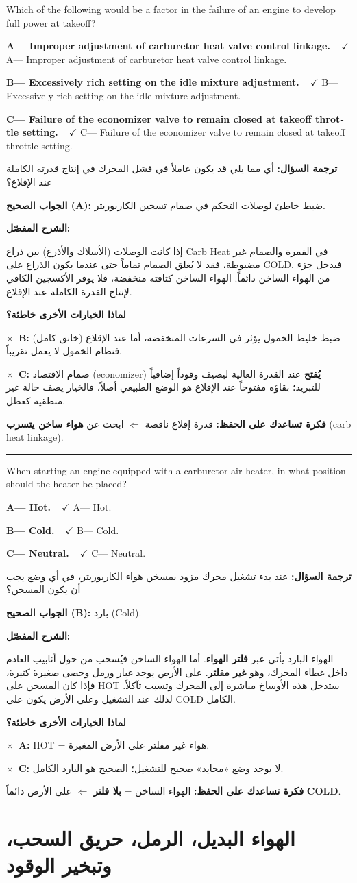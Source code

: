 \documentclass[11pt,a4paper]{article}
\newcommand{\en}[1]{\textenglish{#1}}
\newcommand{\correctletter}{}
\newcommand{\opt}[2]{%
  \ifdefstring{\correctletter}{#1}%
    {\textcolor{ansgreen}{\textbf{#1— #2\ \ $\checkmark$}}}%
    {#1— #2}\par}
\newcommand{\Q}[6]{%
  \renewcommand{\correctletter}{#6}%
  \par\bigskip
  \phantomsection\label{q#1}%
  \begin{tcolorbox}[enhanced,breakable,colback=qback,colframe=qframe,
      arc=2mm,boxrule=0.8pt,fonttitle=\bfseries,
      title={\en{Question #1}}]
    \begin{english}
      #2\par\smallskip
      \opt{A}{#3}\opt{B}{#4}\opt{C}{#5}
    \end{english}
  \end{tcolorbox}}
\newcommand{\tr}[1]{\textbf{\textcolor{qframe}{ترجمة السؤال:}} #1\par}
\newcommand{\ans}[2]{%
  \begin{tcolorbox}[colback=ansback,colframe=ansgreen,boxrule=0.6pt,arc=1.5mm,
      left=4pt,right=4pt,top=2pt,bottom=2pt]
    \textbf{\textcolor{ansgreen}{الجواب الصحيح (\en{#1}):}} #2
  \end{tcolorbox}}
\newcommand{\sharh}[1]{\textbf{\textcolor{conceptc}{الشرح المفصّل:}}\par #1\par}
\newcommand{\nohead}{\textbf{\textcolor{wrongc}{لماذا الخيارات الأخرى خاطئة؟}}\par}
\newcommand{\no}[2]{\hspace*{1em}\textcolor{wrongc}{$\times$}\ \textbf{\en{#1}:} #2\par}
\newcommand{\tip}[1]{%
  \begin{tcolorbox}[colback=tipback,colframe=tipframe,boxrule=0.5pt,arc=1.5mm,
      left=4pt,right=4pt,top=2pt,bottom=2pt]
    \textbf{فكرة تساعدك على الحفظ:} #1
  \end{tcolorbox}}
\newcommand{\qsep}{\par\medskip\noindent\textcolor{qframe!40}{\rule{\linewidth}{0.4pt}}\par}
\begin{document}
\Q{8785}{Which of the following would be a factor in the failure of an engine to develop full power at takeoff?}
{Improper adjustment of carburetor heat valve control linkage.}
{Excessively rich setting on the idle mixture adjustment.}
{Failure of the economizer valve to remain closed at takeoff throttle setting.}{A}
\tr{أي مما يلي قد يكون عاملاً في فشل المحرك في إنتاج قدرته الكاملة عند الإقلاع؟}
\ans{A}{ضبط خاطئ لوصلات التحكم في صمام تسخين الكاربوريتر.}
\sharh{إذا كانت الوصلات (الأسلاك والأذرع) بين ذراع \en{Carb Heat} في القمرة والصمام غير مضبوطة، فقد لا يُغلق الصمام تماماً حتى عندما يكون الذراع على \en{COLD}. فيدخل جزء من الهواء الساخن دائماً. الهواء الساخن كثافته منخفضة، فلا يوفر الأكسجين الكافي لإنتاج القدرة الكاملة عند الإقلاع.}
\nohead
\no{B}{ضبط خليط الخمول يؤثر في السرعات المنخفضة، أما عند الإقلاع (خانق كامل) فنظام الخمول لا يعمل تقريباً.}
\no{C}{صمام الاقتصاد (\en{economizer}) \textbf{يُفتح} عند القدرة العالية ليضيف وقوداً إضافياً للتبريد؛ بقاؤه مفتوحاً عند الإقلاع هو الوضع الطبيعي أصلاً، فالخيار يصف حالة غير منطقية كعطل.}
\tip{قدرة إقلاع ناقصة $\Leftarrow$ ابحث عن \textbf{هواء ساخن يتسرب} (\en{carb heat linkage}).}
\qsep

\Q{8804}{When starting an engine equipped with a carburetor air heater, in what position should the heater be placed?}
{Hot.}
{Cold.}
{Neutral.}{B}
\tr{عند بدء تشغيل محرك مزود بمسخن هواء الكاربوريتر، في أي وضع يجب أن يكون المسخن؟}
\ans{B}{بارد (\en{Cold}).}
\sharh{الهواء البارد يأتي عبر \textbf{فلتر الهواء}. أما الهواء الساخن فيُسحب من حول أنابيب العادم داخل غطاء المحرك، وهو \textbf{غير مفلتر}. على الأرض يوجد غبار ورمل وحصى صغيرة كثيرة، فإذا كان المسخن على \en{HOT} ستدخل هذه الأوساخ مباشرة إلى المحرك وتسبب تآكلاً. لذلك عند التشغيل وعلى الأرض يكون على \en{COLD} الكامل.}
\nohead
\no{A}{\en{HOT} = هواء غير مفلتر على الأرض المغبرة.}
\no{C}{لا يوجد وضع «محايد» صحيح للتشغيل؛ الصحيح هو البارد الكامل.}
\tip{الهواء الساخن = \textbf{بلا فلتر} $\Leftarrow$ على الأرض دائماً \en{\textbf{COLD}}.}

\newpage
\section{الهواء البديل، الرمل، حريق السحب، وتبخير الوقود}
\end{document}
